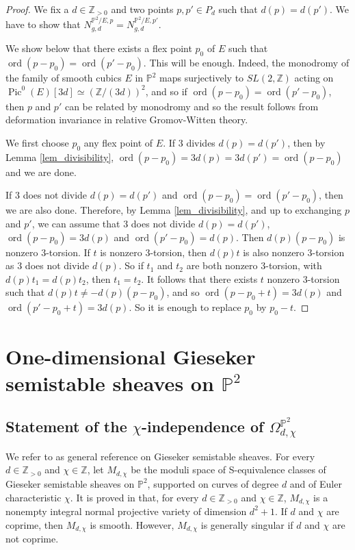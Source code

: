 \documentclass[11pt,letterpaper]{amsart}
\newcommand\PP{\mathbb P}
\newcommand\Z{\mathbb Z}
\newcommand\Pic{\operatorname{Pic}}
\newcommand\ord{\operatorname{ord}}
\begin{document}
\begin{proof}
We fix a $d \in \Z_{>0}$ and two points $p, p' \in P_d$
such that $d(p)=d(p')$. We have to show that 
$N_{g,d}^{\PP^2/E,p}=N_{g,d}^{\PP^2/E,p'}$.

We show below that there exists a flex point $p_0$ of $E$ such that $\ord(p-p_0)=\ord(p'-p_0)$.
This will be enough. Indeed, the monodromy of the family of smooth cubics $E$ in $\PP^2$ maps surjectively to $SL(2,\Z)$
acting on $\Pic^0(E)[3d] \simeq (\Z/(3d))^2$, and so if 
$\ord(p-p_0)=\ord(p'-p_0)$, then $p$ and $p'$ can be related by monodromy and so the result follows from deformation invariance in relative Gromov-Witten theory.

We first choose $p_0$ any flex point of $E$. If $3$ divides 
$d(p)=d(p')$, then by Lemma 
\ref{lem_divisibility}, $\ord(p-p_0)=3d(p)=3d(p')=\ord(p-p_0)$ and we are done.

If $3$ does not divide $d(p)=d(p')$ and $\ord(p-p_0)=\ord(p'-p_0)$, then we are also done.
Therefore, by Lemma \ref{lem_divisibility}, and up to exchanging $p$ and $p'$, we can assume that $3$ does not divide $d(p)=d(p')$,
$\ord(p-p_0)=3d(p)$ and $\ord(p'-p_0)=d(p)$.
Then $d(p)(p-p_0)$ is nonzero $3$-torsion.
If $t$ is nonzero $3$-torsion, then 
$d(p)t$ is also nonzero $3$-torsion as $3$ does not divide 
$d(p)$. So if $t_1$ and $t_2$ are both nonzero $3$-torsion,
with $d(p)t_1=d(p)t_2$, then $t_1=t_2$. It follows that there exists $t$ nonzero $3$-torsion such that $d(p)t \neq -d(p)(p-p_0)$, and so $\ord(p-p_0+t)=3d(p)$ and 
$\ord(p'-p_0+t)=3d(p)$. So it is enough to replace 
$p_0$ by $p_0-t$.
\end{proof}





\section{One-dimensional Gieseker semistable sheaves on $\PP^2$}
\label{section_dimension_one_sheaves}  



\subsection{Statement of the $\chi$-independence of $\Omega_{d,\chi}^{\PP^2}$}
\label{chi_independ_statement}


We refer to \cite{huybrechts2010geometry} as general reference on Gieseker semistable sheaves. For every $d \in \Z_{>0}$ and $\chi \in \Z$, let $M_{d,\chi}$ be the moduli space of S-equivalence classes of Gieseker semistable sheaves on $\PP^2$, supported on curves of degree $d$ and of Euler characteristic $\chi$.
It is proved in \cite{MR1263210} that, for every $d \in \Z_{>0}$ and $\chi \in \Z$, $M_{d,\chi}$ is a
nonempty integral normal projective variety of dimension $d^2+1$. If $d$ and $\chi$ are coprime, then $M_{d,\chi}$ is smooth.
However, $M_{d,\chi}$ is generally singular if $d$ and $\chi$ are not coprime.
\end{document}
